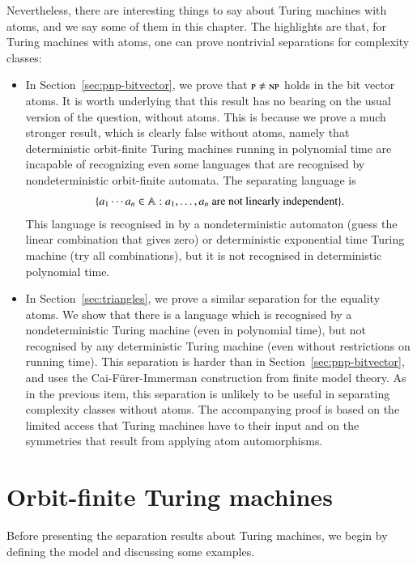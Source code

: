 Nevertheless, there are interesting things to say about Turing machines with atoms, and we say some of them in this chapter. The highlights are that, for Turing machines with atoms, one can prove nontrivial separations for complexity classes:
\begin{itemize}
 \item In Section~\ref{sec:pnp-bitvector}, we prove that $\text{\sc p} \neq \text{\sc{np}}$ holds in the bit vector atoms. It is worth underlying that this result has no bearing on the usual version of the question, without atoms. This is because we prove a much stronger result, which is clearly false without atoms, namely  that deterministic orbit-finite Turing machines running in polynomial time are incapable of recognizing even some languages that are recognised by nondeterministic orbit-finite automata. 
 The separating language is 
 \begin{align*}
 \{a_1 \cdots a_n \in \mathbb A : \text{$a_1,\ldots,a_n$ are not linearly independent}\}.
 \end{align*}
This language is recognised in by a nondeterministic automaton (guess the linear combination that gives zero) or deterministic exponential time Turing machine (try all combinations), but it is not recognised in deterministic polynomial time.
 \item In Section~\ref{sec:triangles}, we prove a similar separation for the equality atoms. We show that there is a language which is recognised by a nondeterministic Turing machine (even in polynomial time), but not recognised by any deterministic Turing machine (even without restrictions on running time). This separation is harder than in Section~\ref{sec:pnp-bitvector}, and uses the Cai-F\"urer-Immerman construction from finite model theory. As in the previous item, this  separation is unlikely to be useful in separating complexity classes without atoms. The accompanying proof is based on the limited access that Turing machines have to their input and on the symmetries that result from applying atom automorphisms.
\end{itemize}







 \section{Orbit-finite Turing machines}
 Before presenting the separation results about Turing machines, we begin by defining the model and discussing some examples.

